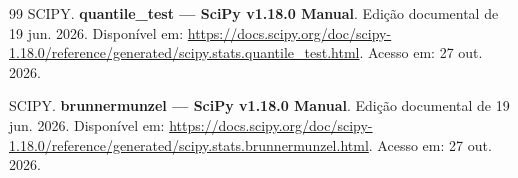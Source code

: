 \begin{thebibliography}{99}
SCIPY. \textbf{quantile\_test — SciPy v1.18.0 Manual}. Edição documental de 19 jun. 2026. Disponível em: \url{https://docs.scipy.org/doc/scipy-1.18.0/reference/generated/scipy.stats.quantile_test.html}. Acesso em: 27 out. 2026.

SCIPY. \textbf{brunnermunzel — SciPy v1.18.0 Manual}. Edição documental de 19 jun. 2026. Disponível em: \url{https://docs.scipy.org/doc/scipy-1.18.0/reference/generated/scipy.stats.brunnermunzel.html}. Acesso em: 27 out. 2026.

\end{thebibliography}
\endgroup

